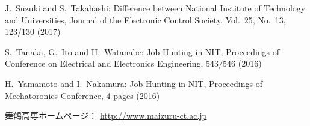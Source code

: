\begin{thebibliography}{99}
	J.~Suzuki and S.~Takahashi: 
	Difference between National Institute of Technology and Universities, 
	Journal of the Electronic Control Society, 
	Vol.~25, No.~13, 123/130 (2017)
	
	S.~Tanaka, G.~Ito and H.~Watanabe: 
	Job Hunting in NIT, 
	Proceedings of Conference on Electrical and Electronics Engineering, 
	543/546 (2016)
	
	H.~Yamamoto and I.~Nakamura: 
	Job Hunting in NIT, 
	Proceedings of Mechatoronics Conference, 
	4 pages (2016)
	
	舞鶴高専ホームページ：
	\url{http://www.maizuru-ct.ac.jp}
\end{thebibliography}
